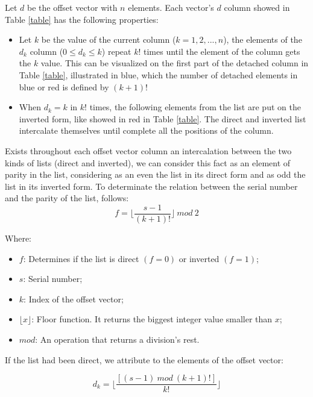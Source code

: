 \documentclass {amsart}
\begin{document}
Let {$d$} be the offset vector with {$n$} elements. Each vector's
{$d$} column showed in Table \ref{table} has the following
properties:
\begin{itemize}
\item Let {$k$} be the value of the current column ({$k = 1, 2,
..., n$}), the elements of the {$d_k$} column ({$0 \leq d_k \leq
k$}) repeat {$k!$} times until the element of the column gets the
{$k$} value. This can be visualized on the first part of the
detached column in Table \ref{table}, illustrated in blue, which
the number of detached elements in blue or red is defined by {$(k
+ 1)!$} \item When {$d_k = k$} in {$k!$} times, the following
elements from the list are put on the inverted form, like showed
in red in Table \ref{table}. The direct and inverted list
intercalate themselves until complete all the positions of the
column.
\end{itemize}

Exists throughout each offset vector column an intercalation
between the two kinds of lists (direct and inverted), we can
consider this fact as an element of parity in the list,
considering as an even the list in its direct form and as odd the
list in its inverted form. To determinate the relation between the
serial number and the parity of the list, follows:
\begin{equation}
f =
\displaystyle\biggl\lfloor\frac{s-1}{(k+1)!}\displaystyle\biggl\rfloor
~mod~2
\end{equation}

Where:
\begin{itemize}
    \item {$f$}: Determines if the list is direct {$(f = 0)$} or inverted {$(f = 1)$};
    \item {$s$}: Serial number;
    \item {$k$}: Index of the offset vector;
    \item {$\lfloor x \rfloor$}: Floor function. It returns the biggest integer value smaller than {$x$};
    \item {$mod$}: An operation that returns a division's rest.
\end{itemize}

If the list had been direct, we attribute to the elements of the
offset vector:

\begin{equation}    \label{eqt}
d_k = \displaystyle\biggl\lfloor\frac{[(s-1) ~mod~
(k+1)!]}{k!}\displaystyle\biggl\rfloor
\end{equation}
\end{document}
